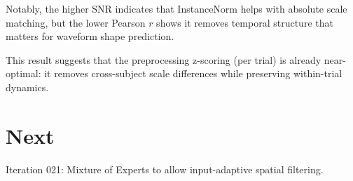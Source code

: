 \documentclass[11pt,a4paper]{article}
\begin{document}
Notably, the higher SNR indicates that InstanceNorm helps with absolute scale
matching, but the lower Pearson $r$ shows it removes temporal structure that
matters for waveform shape prediction.

This result suggests that the preprocessing z-scoring (per trial) is already
near-optimal: it removes cross-subject scale differences while preserving
within-trial dynamics.

\section{Next}
Iteration 021: Mixture of Experts to allow input-adaptive spatial filtering.
\end{document}
